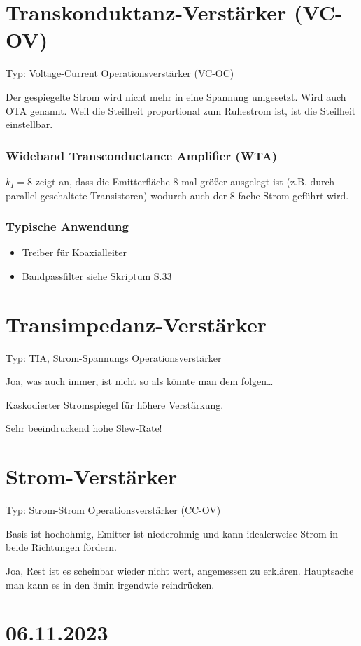 \documentclass[a4paper]{article}
\begin{document}
\section*{Transkonduktanz-Verstärker (VC-OV)}
Typ: Voltage-Current Operationsverstärker (VC-OC)

Der gespiegelte Strom wird nicht mehr in eine Spannung umgesetzt.
Wird auch OTA genannt. Weil die Steilheit proportional zum Ruhestrom ist, ist 
die Steilheit einstellbar.

\subsubsection*{Wideband Transconductance Amplifier (WTA)}
$k_{I}=8$ zeigt an, dass die Emitterfläche 8-mal größer ausgelegt ist (z.B.
durch parallel geschaltete Transistoren) wodurch auch der 8-fache Strom geführt
 wird.

\subsubsection*{Typische Anwendung}
\begin{itemize}
    \item Treiber für Koaxialleiter
    \item Bandpassfilter
        siehe Skriptum S.33
\end{itemize}

\section*{Transimpedanz-Verstärker}
Typ: TIA, Strom-Spannungs Operationsverstärker

Joa, was auch immer, ist nicht so als könnte man dem folgen\ldots

Kaskodierter Stromspiegel für höhere Verstärkung.

Sehr beeindruckend hohe Slew-Rate!

\section*{Strom-Verstärker}
Typ: Strom-Strom Operationsverstärker (CC-OV)

Basis ist hochohmig, Emitter ist niederohmig und kann idealerweise Strom in
beide Richtungen fördern.

Joa, Rest ist es scheinbar wieder nicht wert, angemessen zu erklären.
Hauptsache man kann es in den 3min irgendwie reindrücken.


\section*{06.11.2023}
\end{document}
